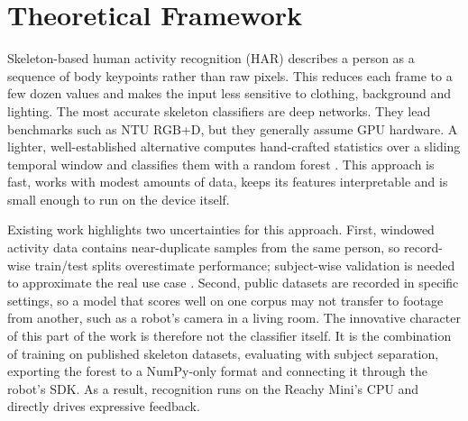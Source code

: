 \section{Theoretical Framework}

Skeleton-based human activity recognition (HAR) describes a person as a
sequence of body keypoints rather than raw pixels. This reduces each frame to
a few dozen values and makes the input less sensitive to clothing, background
and lighting. The most accurate skeleton classifiers are deep networks. They
lead benchmarks such as NTU RGB+D, but they generally assume GPU hardware. A
lighter, well-established alternative computes hand-crafted statistics over a
sliding temporal window and classifies them with a random forest
\cite{breiman2001random}. This approach is fast, works with modest amounts of
data, keeps its features interpretable and is small enough to run on the device
itself.

Existing work highlights two uncertainties for this approach. First, windowed
activity data contains near-duplicate samples from the same person, so
record-wise train/test splits overestimate performance; subject-wise
validation is needed to approximate the real use case
\cite{saeb2017need}. Second, public datasets are recorded in specific settings,
so a model that scores well on one corpus may not transfer to footage from
another, such as a robot's camera in a living room. The innovative character
of this part of the work is therefore not the classifier itself. It is the
combination of training on published skeleton datasets, evaluating with subject
separation, exporting the forest to a NumPy-only format and connecting it
through the robot's SDK. As a result, recognition runs on the Reachy Mini's CPU
and directly drives expressive feedback.